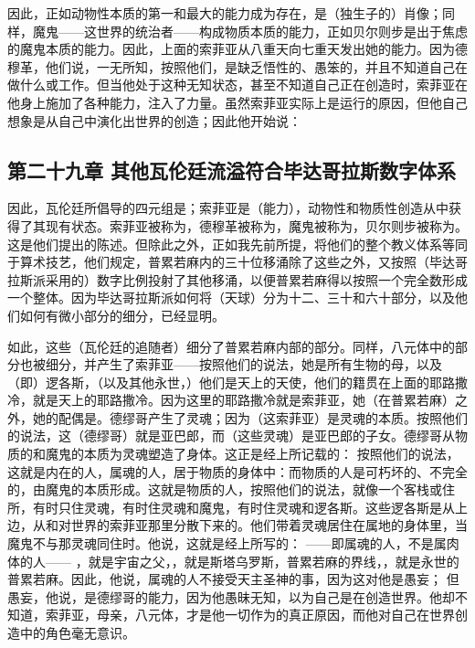 因此，正如动物性本质的第一和最大的能力成为存在，是（独生子的）肖像；同样，魔鬼——这世界的统治者——构成物质本质的能力，正如贝尔则步是出于焦虑的魔鬼本质的能力。因此，上面的索菲亚从八重天向七重天发出她的能力。因为德穆革，他们说，一无所知，按照他们，是缺乏悟性的、愚笨的，并且不知道自己在做什么或工作。但当他处于这种无知状态，甚至不知道自己正在创造时，索菲亚在他身上施加了各种能力，注入了力量。虽然索菲亚实际上是运行的原因，但他自己想象是从自己中演化出世界的创造；因此他开始说：\par


\subsection{第二十九章 其他瓦伦廷流溢符合毕达哥拉斯数字体系}

因此，瓦伦廷所倡导的四元组是；索菲亚是（能力），动物性和物质性创造从中获得了其现有状态。索菲亚被称为，德穆革被称为，魔鬼被称为，贝尔则步被称为。这是他们提出的陈述。但除此之外，正如我先前所提，将他们的整个教义体系等同于算术技艺，他们规定，普累若麻内的三十位移涌除了这些之外，又按照（毕达哥拉斯派采用的）数字比例投射了其他移涌，以便普累若麻得以按照一个完全数形成一个整体。因为毕达哥拉斯派如何将（天球）分为十二、三十和六十部分，以及他们如何有微小部分的细分，已经显明。\par

如此，这些（瓦伦廷的追随者）细分了普累若麻内部的部分。同样，八元体中的部分也被细分，并产生了索菲亚——按照他们的说法，她是所有生物的母，以及（即）逻各斯，（以及其他永世，）他们是天上的天使，他们的籍贯在上面的耶路撒冷，就是天上的耶路撒冷。因为这里的耶路撒冷就是索菲亚，她（在普累若麻）之外，她的配偶是。德缪哥产生了灵魂；因为（这索菲亚）是灵魂的本质。按照他们的说法，这（德缪哥）就是亚巴郎，而（这些灵魂）是亚巴郎的子女。德缪哥从物质的和魔鬼的本质为灵魂塑造了身体。这正是经上所记载的：  按照他们的说法，这就是内在的人，属魂的人，居于物质的身体中：而物质的人是可朽坏的、不完全的，由魔鬼的本质形成。这就是物质的人，按照他们的说法，就像一个客栈或住所，有时只住灵魂，有时住灵魂和魔鬼，有时住灵魂和逻各斯。这些逻各斯是从上边，从和对世界的索菲亚那里分散下来的。他们带着灵魂居住在属地的身体里，当魔鬼不与那灵魂同住时。他说，这就是经上所写的：  ——即属魂的人，不是属肉体的人—— ，就是宇宙之父，，就是斯塔乌罗斯，普累若麻的界线，，就是永世的普累若麻。因此，他说，属魂的人不接受天主圣神的事，因为这对他是愚妄； 但愚妄，他说，是德缪哥的能力，因为他愚昧无知，以为自己是在创造世界。他却不知道，索菲亚，母亲，八元体，才是他一切作为的真正原因，而他对自己在世界创造中的角色毫无意识。\par

